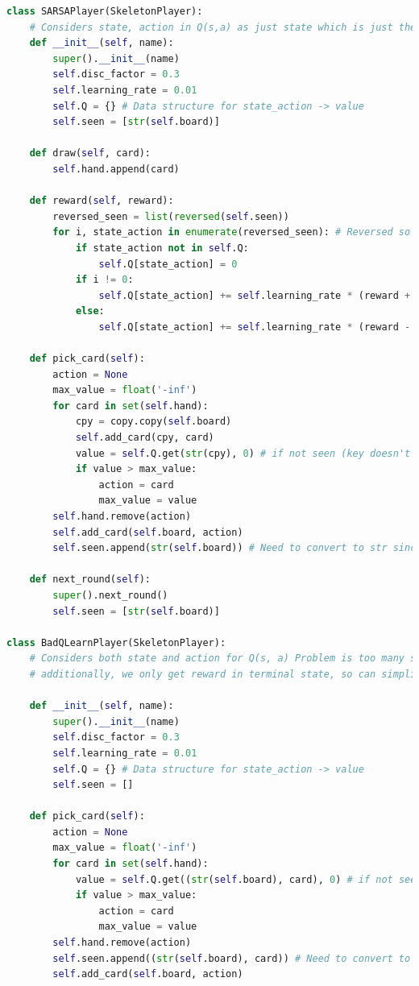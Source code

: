 \begin{lstlisting}[language=Python]
class SARSAPlayer(SkeletonPlayer):
    # Considers state, action in Q(s,a) as just state which is just the board reducing state action space
    def __init__(self, name):
        super().__init__(name)
        self.disc_factor = 0.3
        self.learning_rate = 0.01
        self.Q = {} # Data structure for state_action -> value
        self.seen = [str(self.board)]

    def draw(self, card):
        self.hand.append(card)
    
    def reward(self, reward):
        reversed_seen = list(reversed(self.seen))
        for i, state_action in enumerate(reversed_seen): # Reversed so that we access the "future" state_actions first and populate those entries
            if state_action not in self.Q:
                self.Q[state_action] = 0
            if i != 0:
                self.Q[state_action] += self.learning_rate * (reward + self.disc_factor * self.Q[reversed_seen[i - 1]] - self.Q[state_action])
            else:
                self.Q[state_action] += self.learning_rate * (reward - self.Q[state_action])

    def pick_card(self):
        action = None
        max_value = float('-inf')
        for card in set(self.hand):
            cpy = copy.copy(self.board)
            self.add_card(cpy, card)
            value = self.Q.get(str(cpy), 0) # if not seen (key doesn't exist), value is just 0
            if value > max_value:
                action = card
                max_value = value
        self.hand.remove(action)
        self.add_card(self.board, action)
        self.seen.append(str(self.board)) # Need to convert to str since mutable types like list aren't hashable

    def next_round(self):
        super().next_round()
        self.seen = [str(self.board)]

class BadQLearnPlayer(SkeletonPlayer):
    # Considers both state and action for Q(s, a) Problem is too many state action combos, doesn't really learn anything,
    # additionally, we only get reward in terminal state, so can simplify the problem with SARSAPlayer

    def __init__(self, name):
        super().__init__(name)
        self.disc_factor = 0.3
        self.learning_rate = 0.01
        self.Q = {} # Data structure for state_action -> value
        self.seen = []

    def pick_card(self):
        action = None
        max_value = float('-inf')
        for card in set(self.hand):
            value = self.Q.get((str(self.board), card), 0) # if not seen (key doesn't exist), value is just 0
            if value > max_value:
                action = card
                max_value = value
        self.hand.remove(action)
        self.seen.append((str(self.board), card)) # Need to convert to str since mutable types like list aren't hashable
        self.add_card(self.board, action)
    

\end{lstlisting}
